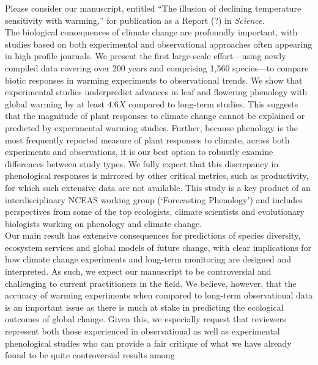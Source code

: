 \documentclass[11pt,a4paper]{article}
\begin{document}
Please consider our manuscript, entitled ``The illusion of declining temperature sensitivity with warming,'' for publication as a Report (?) in \emph{Science}. 
\vspace{1.5ex}\\
The biological consequences of climate change are profoundly
important, with studies based on both experimental
\citep{Harte:1995lj,Knapp:2002py,Harmon:2009pd,Langley:2010cr} and
observational
\citep{Fitter:2002ux,Loarie:2009ax,Lewis:2009lq,Bond-Lamberty:2010dq,Boyce:2010rr}
approaches often appearing in high profile journals. We present the first
large-scale effort---using newly compiled data covering over 200
years and comprising 1,560 species---to compare
biotic responses in warming experiments to observational trends. We
show that experimental studies underpredict advances in leaf and flowering
phenology with global warming by at
least \(4.6X\) compared to long-term studies. This suggests that the magnitude of plant
responses to climate change cannot be explained or predicted by
experimental warming studies. Further, because phenology is the most frequently reported measure of
plant responses to climate,
across both experiments and observations, it is our 
best option to robustly examine differences between study types. We
fully expect that this discrepancy in phenological responses is
mirrored by 
other critical metrics, such as productivity, for which such extensive data
are not available. This study is a key product of an interdisciplinary NCEAS working group (`Forecasting Phenology') and includes perspectives from some of the top ecologists, climate scientists and evolutionary biologists working on phenology and climate change.
\vspace{1.5ex}\\
\noindent Our main result has
extensive consequences for predictions of species diversity, ecosystem
services and global models of future change, with clear implications
for how climate change experiments and long-term monitoring are
designed and interpreted. As such, we expect our manuscript to be
controversial and challenging to current practitioners in the
field. We believe, however, that the accuracy of warming experiments
when compared to long-term observational data is an important issue as
there is much at stake in predicting the ecological outcomes of global
change.  Given this, we especially request that reviewers
represent both those experienced in observational as well as
experimental phenological studies who can provide a fair critique of
what we have already found to be quite controversial results among
\end{document}
